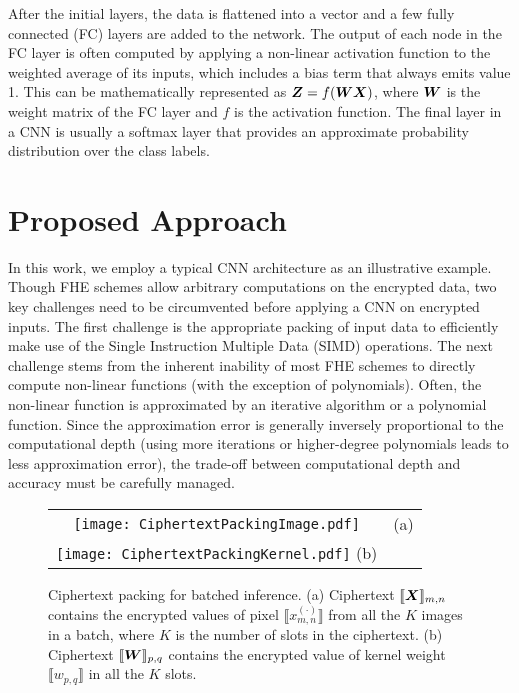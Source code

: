 \documentclass[letterpaper]{article} %
\newcommand{\vect}[1]{\mbox{\boldmath$#1$}}
\begin{document}
After the initial layers, the data is flattened into a vector and a few fully connected (FC) layers are added to the network. The output of each node in the FC layer is often computed by applying a non-linear activation function to the weighted average of its inputs, which includes a bias term that always emits value 1. This can be mathematically represented as $\vect{Z} = f(\vect{W}\vect{X})$, where $\vect{W}$ is the weight matrix of the FC layer and $f$ is the activation function. The final layer in a CNN is usually a softmax layer that provides an approximate probability distribution over the class labels.

\section{Proposed Approach}
\label{sec:approach}

In this work, we employ a typical CNN architecture as an illustrative example. Though FHE schemes allow arbitrary computations on the encrypted data, two key challenges need to be circumvented before applying a CNN on encrypted inputs. The first challenge is the appropriate packing of input data to efficiently make use of the Single Instruction Multiple Data (SIMD) operations. The next challenge stems from the inherent inability of most FHE schemes to directly compute non-linear functions (with the exception of polynomials). Often, the non-linear function is approximated by an iterative algorithm or a polynomial function. Since the approximation error is generally inversely proportional to the computational depth (using more iterations or higher-degree polynomials leads to less approximation error), the trade-off between computational depth and accuracy must be carefully managed.

\begin{figure*}[t]
    \begin{center}
    \begin{tabular}{cc}
    \texttt{[image: CiphertextPackingImage.pdf]} & (a) \\
    \texttt{[image: CiphertextPackingKernel.pdf]} (b) \\
    \end{tabular}
    \caption{Ciphertext packing for batched inference. (a) Ciphertext $\llbracket \vect{X} \rrbracket_{m,n}$ contains the encrypted values of pixel $\llbracket x_{m,n}^{(\cdot)} \rrbracket$ from all the $K$ images in a batch, where $K$ is the number of slots in the ciphertext. (b) Ciphertext $\llbracket \vect{W} \rrbracket_{p,q}$ contains the encrypted value of kernel weight $\llbracket w_{p,q} \rrbracket$ in all the $K$ slots.}
    \label{fig:BatchedInference}
    \end{center}
\end{figure*}
\end{document}

